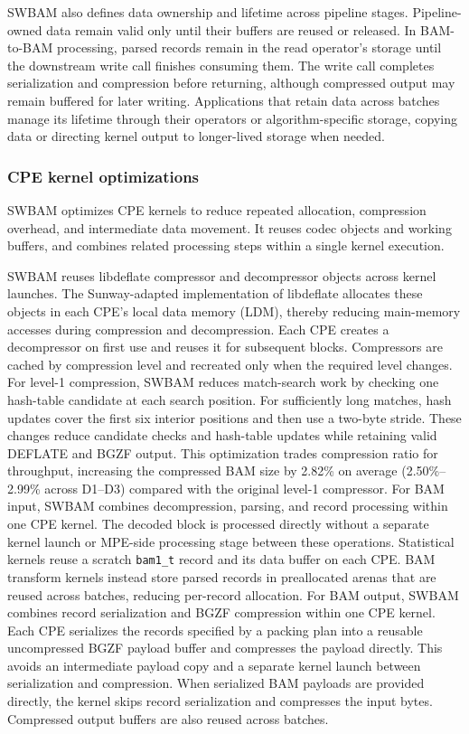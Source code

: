 \documentclass[lettersize,journal]{IEEEtran}
\begin{document}
SWBAM also defines data ownership and lifetime across pipeline stages.
Pipeline-owned data remain valid only until their buffers are reused or released.
In BAM-to-BAM processing, parsed records remain in the read operator's storage until the downstream write call finishes consuming them.
The write call completes serialization and compression before returning, although compressed output may remain buffered for later writing.
Applications that retain data across batches manage its lifetime through their operators or algorithm-specific storage, copying data or directing kernel output to longer-lived storage when needed.

\subsubsection{CPE kernel optimizations}
SWBAM optimizes CPE kernels to reduce repeated allocation, compression overhead, and intermediate data movement.
It reuses codec objects and working buffers, and combines related processing steps within a single kernel execution.

SWBAM reuses libdeflate compressor and decompressor objects across kernel launches.
The Sunway-adapted implementation of libdeflate allocates these objects in each CPE's local data memory (LDM), thereby reducing main-memory accesses during compression and decompression.
Each CPE creates a decompressor on first use and reuses it for subsequent blocks.
Compressors are cached by compression level and recreated only when the required level changes.
For level-1 compression, SWBAM reduces match-search work by checking one hash-table candidate at each search position.
For sufficiently long matches, hash updates cover the first six interior positions and then use a two-byte stride.
These changes reduce candidate checks and hash-table updates while retaining valid DEFLATE and BGZF output.
This optimization trades compression ratio for throughput, increasing the compressed BAM size by 2.82\% on average (2.50\%--2.99\% across D1--D3) compared with the original level-1 compressor.
For BAM input, SWBAM combines decompression, parsing, and record processing within one CPE kernel.
The decoded block is processed directly without a separate kernel launch or MPE-side processing stage between these operations.
Statistical kernels reuse a scratch \texttt{bam1\_t} record and its data buffer on each CPE.
BAM transform kernels instead store parsed records in preallocated arenas that are reused across batches, reducing per-record allocation.
For BAM output, SWBAM combines record serialization and BGZF compression within one CPE kernel.
Each CPE serializes the records specified by a packing plan into a reusable uncompressed BGZF payload buffer and compresses the payload directly.
This avoids an intermediate payload copy and a separate kernel launch between serialization and compression.
When serialized BAM payloads are provided directly, the kernel skips record serialization and compresses the input bytes.
Compressed output buffers are also reused across batches.
\end{document}
